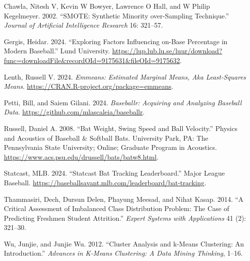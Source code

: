 \documentclass[
  letterpaper,
  DIV=11,
  numbers=noendperiod]{scrartcl}
\newlength{\cslhangindent}
\newenvironment{CSLReferences}[2] %
 {\begin{list}{}{%
  \setlength{\itemindent}{0pt}
  \setlength{\leftmargin}{0pt}
  \setlength{\parsep}{0pt}
  \ifodd #1
   \setlength{\leftmargin}{\cslhangindent}
   \setlength{\itemindent}{-1\cslhangindent}
  \fi
  \setlength{\itemsep}{#2\baselineskip}}}
 {\end{list}}
\begin{document}
\label{refs}
\begin{CSLReferences}{1}{0}
Chawla, Nitesh V, Kevin W Bowyer, Lawrence O Hall, and W Philip
Kegelmeyer. 2002. {``SMOTE: Synthetic Minority over-Sampling
Technique.''} \emph{Journal of Artificial Intelligence Research} 16:
321--57.

Gergis, Heidar. 2024. {``Exploring Factors Influencing on-Base
Percentage in Modern Baseball.''} Lund University.
\url{https://lup.lub.lu.se/luur/download?func=downloadFile&recordOId=9175631&fileOId=9175632}.

Lenth, Russell V. 2024. \emph{Emmeans: Estimated Marginal Means, Aka
Least-Squares Means}. \url{https://CRAN.R-project.org/package=emmeans}.

Petti, Bill, and Saiem Gilani. 2024. \emph{Baseballr: Acquiring and
Analyzing Baseball Data}. \url{https://github.com/mlascaleia/baseballr}.

Russell, Daniel A. 2008. {``Bat Weight, Swing Speed and Ball
Velocity.''} Physics and Acoustics of Baseball \& Softball Bats.
University Park, PA: The Pennsylvania State University; Online; Graduate
Program in Acoustics.
\url{https://www.acs.psu.edu/drussell/bats/batw8.html}.

Statcast, MLB. 2024. {``Statcast Bat Tracking Leaderboard.''} Major
League Baseball.
\url{https://baseballsavant.mlb.com/leaderboard/bat-tracking}.

Thammasiri, Dech, Dursun Delen, Phayung Meesad, and Nihat Kasap. 2014.
{``A Critical Assessment of Imbalanced Class Distribution Problem: The
Case of Predicting Freshmen Student Attrition.''} \emph{Expert Systems
with Applications} 41 (2): 321--30.

Wu, Junjie, and Junjie Wu. 2012. {``Cluster Analysis and k-Means
Clustering: An Introduction.''} \emph{Advances in K-Means Clustering: A
Data Mining Thinking}, 1--16.

\end{CSLReferences}
\end{document}
